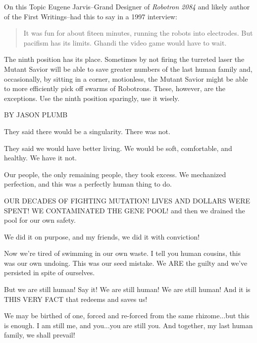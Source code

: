 \documentclass{amsbook}
\begin{document}
On this Topic Eugene Jarvis--Grand Designer of {\em Robotron 2084} and
likely author of the First Writings--had this to say in a 1997
interview:

\begin{quotation}
    It was fun for about fiteen minutes, running the robots into
    electrodes. But pacifism has its limits. Ghandi the video game
    would have to wait.
\end{quotation}

The ninth position has its place. Sometimes by not firing the turreted
laser the Mutant Savior will be able to save greater numbers of the
last human family and, occasionally, by sitting in a corner,
motionless, the Mutant Savior might be able to more efficiently pick
off swarms of Robotrons. These, however, are the exceptions. Use the
ninth position sparingly, use it wisely.

%
%
%

\clearpage

{\ROBOFONTx BY JASON PLUMB}
\vskip 36pt

They said there would be a singularity.  There was not.

They said we would have better living.  We would be soft, comfortable, and healthy.  We have it not.

Our people, the only remaining people, they took excess.  We mechanized perfection, and this was a perfectly human thing to do.

OUR DECADES OF FIGHTING MUTATION!  LIVES AND DOLLARS WERE SPENT!  WE CONTAMINATED THE GENE POOL!
and then we drained the pool for our own safety.

We did it on purpose, and my friends, we did it with conviction!

Now we're tired of swimming in our own waste.
I tell you human cousins, this was our own undoing.  This was our seed mistake.  We ARE the guilty and we've persisted in spite of ourselves.

But we are still human!  Say it!  We are still human!  We are still human!
And it is THIS VERY FACT that redeems and saves us!

We may be birthed of one, forced and re-forced from the same rhizome...but this is enough.  I am still me, and you...you are still you.  And together, my last human family, we shall prevail!
\end{document}
